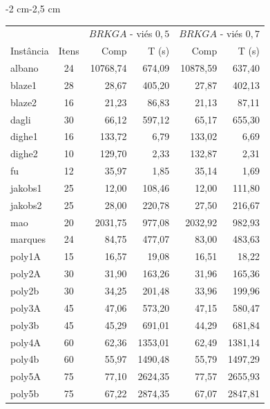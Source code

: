 \documentclass[12pt, openright, twoside, a4paper, english, brazilian]{USPSC-classe/USPSC}
\newcommand{\lgray}{\cellcolor{lightgray}}
\begin{document}
\begin{adjustwidth}{-2 cm}{-2,5 cm}\centering\begin{threeparttable}[!htb]
\renewcommand{\arraystretch}{1.2}%
    \caption{Resultados obtidos pelas duas variações da meta-heurística $BRKGA$, com viés de $0,5$ e $0,7$.}
    \scriptsize{
        \begin{tabular}{|l|c|rr|rr|}\hline
        \multicolumn{1}{|c|}{} & \multicolumn{1}{c|}{} &  \multicolumn{2}{c|}{$BRKGA$ - viés $0,5$} & \multicolumn{2}{c|}{$BRKGA$ - viés $0,7$}\\
        Instância &Itens &Comp &T (s) &Comp &T (s) \\\hline
        albano &24 &\lgray10768,74 &674,09 &10878,59 &637,40 \\
        blaze1 &28 &28,67 &405,20 &\lgray27,87 &402,13 \\
        blaze2 &16 &21,23 &86,83 &\lgray21,13 &87,11 \\
        dagli &30 &66,12 &597,12 &\lgray65,17 &655,30 \\
        dighe1 &16 &133,72 &6,79 &\lgray133,02 &6,69 \\
        dighe2 &10 &\lgray129,70 &2,33 &132,87 &2,31 \\
        fu &12 &35,97 &1,85 &\lgray35,14 &1,69 \\
        jakobs1 &25 &\lgray12,00 &108,46 &\lgray12,00 &111,80 \\
        jakobs2 &25 &28,00 &220,78 &\lgray27,50 &216,67 \\
        mao &20 &\lgray2031,75 &977,08 &2032,92 &982,93 \\
        marques &24 &84,75 &477,07 &\lgray83,00 &483,63 \\
        poly1A &15 &16,57 &19,08 &\lgray16,51 &18,22 \\
        poly2A &30 &\lgray31,90 &163,26 &31,96 &165,36 \\
        poly2b &30 &34,25 &201,48 &\lgray33,96 &199,96 \\
        poly3A &45 &\lgray47,06 &573,20 &47,15 &580,47 \\
        poly3b &45 &45,29 &691,01 &\lgray44,29 &681,84 \\
        poly4A &60 &\lgray62,36 &1353,01 &62,49 &1381,14 \\
        poly4b &60 &55,97 &1490,48 &\lgray55,79 &1497,29 \\
        poly5A &75 &\lgray77,10 &2624,35 &77,57 &2655,93 \\
        poly5b &75 &67,22 &2874,35 &\lgray67,07 &2847,81 \\

\end{tabular}}
\end{threeparttable}
\end{adjustwidth}
\end{document}
